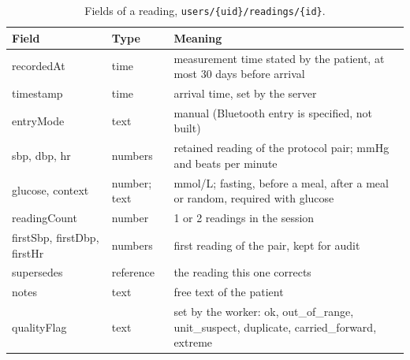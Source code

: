 \begin{table}[htbp]
\centering\footnotesize
\caption{Fields of a reading, \texttt{users/\{uid\}/readings/\{id\}}.}\label{tab:schema-reading}
\begin{tabularx}{\textwidth}{@{}>{\ttfamily\raggedright\arraybackslash}p{3.4cm} >{\raggedright\arraybackslash}p{2.1cm} X@{}}
\toprule
\normalfont\textbf{Field} & \textbf{Type} & \textbf{Meaning} \\
\midrule
recordedAt & time & measurement time stated by the patient, at most 30 days before arrival \\
timestamp & time & arrival time, set by the server \\
entryMode & text & manual (Bluetooth entry is specified, not built) \\
sbp, dbp, hr & numbers & retained reading of the protocol pair; mmHg and beats per minute \\
glucose, context & number; text & mmol/L; fasting, before a meal, after a meal or random, required with glucose \\
readingCount & number & 1 or 2 readings in the session \\
firstSbp, firstDbp, firstHr & numbers & first reading of the pair, kept for audit \\
supersedes & reference & the reading this one corrects \\
notes & text & free text of the patient \\
qualityFlag & text & set by the worker: ok, out\_of\_range, unit\_suspect, duplicate, carried\_forward, extreme \\
\bottomrule
\end{tabularx}
\end{table}

